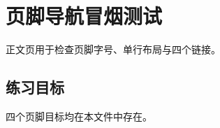 \documentclass[UTF8,a4paper,11pt,openany]{ctexbook}
\begin{document}
\hypertarget{SL:toc}{}
\tableofcontents
\chapter{页脚导航冒烟测试}
\hypertarget{SL:chapter:\thechapter}{}
正文页用于检查页脚字号、单行布局与四个链接。
\newpage
{}\hypertarget{SL:exercises:\thechapter}{}
\section*{练习目标}
\hypertarget{SL:answers:\thechapter}{}
四个页脚目标均在本文件中存在。
\end{document}
